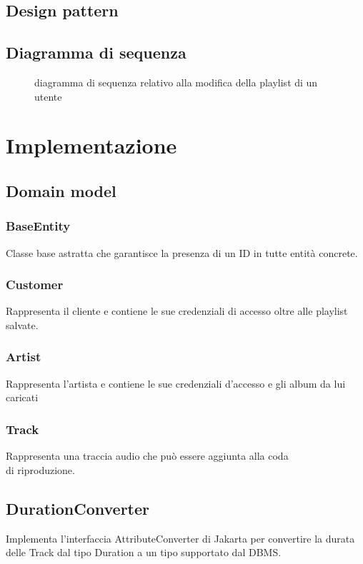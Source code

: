 \documentclass{article}
\begin{document}
  \subsection{Design pattern}

  \subsection{Diagramma di sequenza}
  \begin{figure}[H]
    \centering
    
    \caption{diagramma di sequenza relativo alla modifica della playlist di un utente}
    \label{fig:seqDiag}
  \end{figure}


  \section{Implementazione}

  \subsection{Domain model}

  \subsubsection{BaseEntity}
  Classe base astratta che garantisce la presenza di un ID in tutte entità concrete.
  \subsubsection{Customer}
  Rappresenta il cliente e contiene le sue credenziali di accesso oltre alle playlist salvate.
  \subsubsection{Artist}
  Rappresenta l'artista e contiene le sue credenziali d'accesso e gli album da lui caricati
  \subsubsection{Track}
  Rappresenta una traccia audio che può essere aggiunta alla coda\\ di riproduzione.

  \subsection{DurationConverter}
  Implementa l'interfaccia AttributeConverter di Jakarta per convertire la durata delle Track dal tipo Duration a un tipo supportato dal DBMS.
\end{document}
